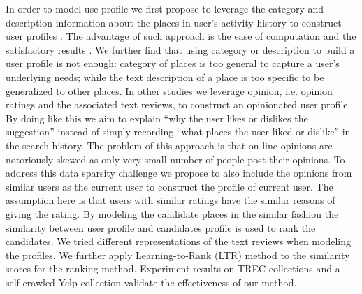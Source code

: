 In order to model use profile we first propose to leverage the 
category and description information about the places in user's activity 
history to construct user profiles \cite{udel:treccs2012}. 
The advantage of such approach is the ease of computation and the satisfactory 
results \cite{adriel:overview}. 
We further find that using category or description to build a user profile 
is not enough: category of places is too general to capture a user's 
underlying needs; while the text description of a place is too specific to 
be generalized to other places. 
In other studies 
\cite{udel:treccs2013,udel:treccs2014,udel:treccs2015,Yang:2013:OUP:2499178.2499191,Yang2015}
we leverage opinion, 
i.e. opinion ratings and the associated text reviews, to construct an 
opinionated user profile. By doing like this we aim to explain 
``why the user likes or dislikes the suggestion'' instead of simply recording 
``what places the user liked or dislike'' in the search history. 
The problem of this approach is that on-line opinions are notoriously skewed 
as only very small number of people post their opinions. 
To address this data sparsity challenge we propose to also include the 
opinions from similar users as the current user to construct the profile of 
current user. The assumption here is that users with similar ratings have 
the similar reasons of giving the rating. By modeling the candidate places 
in the similar fashion the similarity between user profile and candidates 
profile is used to rank the candidates. We tried different representations 
of the text reviews when modeling the profiles. We further apply 
Learning-to-Rank (LTR) method to the similarity scores for the ranking method. 
Experiment results on TREC collections and a self-crawled Yelp collection 
validate the effectiveness of our method.

